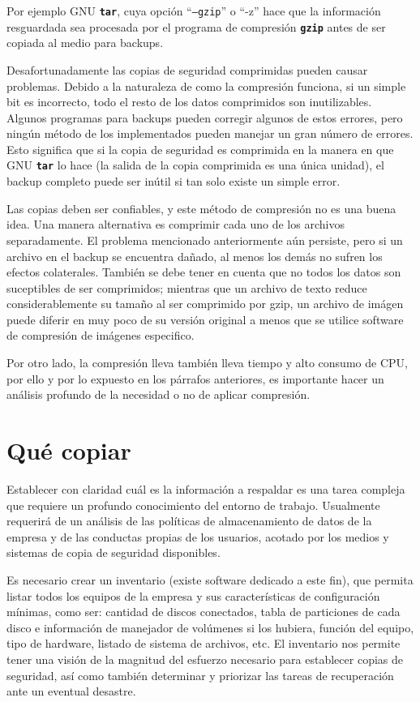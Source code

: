 \documentclass[12pt]{article}
\begin{document}
Por ejemplo GNU \texttt{\textbf{tar}}, cuya opción ``{\tt --gzip}'' o 
``{-z}'' hace que la información resguardada sea procesada por el programa 
de compresión \texttt{\textbf{gzip}} antes de ser copiada al medio para 
backups.
	
Desafortunadamente las copias de seguridad comprimidas pueden causar 
problemas. Debido a la naturaleza de como la compresión funciona, si un 
simple bit es incorrecto, todo el resto de los datos comprimidos son 
inutilizables. Algunos programas para backups pueden corregir algunos de 
estos errores, pero ningún método de los implementados 
pueden manejar un gran número de errores. Esto significa que si la copia de 
seguridad es comprimida en la manera en que GNU \texttt{\textbf{tar}} lo 
hace (la salida de la copia comprimida es una única unidad), el backup 
completo puede ser inútil si tan solo existe un simple error.

Las copias deben ser confiables, y este método de compresión no es una 
buena idea. Una manera alternativa es comprimir cada uno de los archivos 
separadamente. El problema mencionado anteriormente aún persiste, pero si 
un archivo en el backup se encuentra dañado, al menos los demás no sufren 
los efectos colaterales. También se debe tener en cuenta que no todos los 
datos son suceptibles de ser comprimidos; mientras que un archivo de 
texto reduce considerablemente su tamaño al ser comprimido por gzip, un
archivo de imágen puede diferir en muy poco de su versión original a menos
que se utilice software de compresión de imágenes especifico. 

Por otro lado, la compresión lleva también lleva tiempo y alto consumo 
de CPU, por ello y por lo expuesto en los párrafos anteriores, es importante
hacer un análisis profundo de la necesidad o no de aplicar compresión.
	
\section*{Qué copiar}

Establecer con claridad cuál es la información a respaldar es una tarea 
compleja que requiere un profundo conocimiento del entorno de trabajo. 
Usualmente requerirá de un análisis de las políticas de almacenamiento 
de datos de la empresa y de las conductas propias de los usuarios, acotado
por los medios y sistemas de copia de seguridad disponibles.  

Es necesario crear un inventario (existe software dedicado a este fin), que
permita listar todos los equipos de la empresa y sus características de 
configuración mínimas, como ser: cantidad de discos conectados, tabla de
particiones de cada disco e información de manejador de volúmenes si los 
hubiera, función del equipo, tipo de hardware, listado de sistema de 
archivos, etc. El inventario nos permite tener una visión de la magnitud
del esfuerzo necesario para establecer copias de seguridad, así como 
también determinar y priorizar las tareas de recuperación ante un eventual
desastre. 
\end{document}
